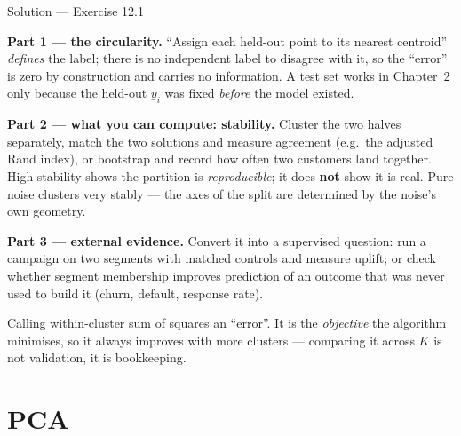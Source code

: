 \documentclass[aspectratio=169,11pt]{beamer}
\begin{document}
\begin{frame}{Solution --- Exercise 12.1}
  \footnotesize
\begin{solutionbox}
  \textbf{Part 1 --- the circularity.} ``Assign each held-out point to its nearest
  centroid'' \emph{defines} the label; there is no independent label to disagree with it,
  so the ``error'' is zero by construction and carries no information. A test set works in
  Chapter~2 only because the held-out $y_i$ was fixed \emph{before} the model existed.

  \medskip
  \textbf{Part 2 --- what you can compute: stability.} Cluster the two halves separately,
  match the two solutions and measure agreement (e.g.\ the adjusted Rand index), or
  bootstrap and record how often two customers land together. High stability shows the
  partition is \emph{reproducible}; it does \textbf{not} show it is real. Pure noise
  clusters very stably --- the axes of the split are determined by the noise's own
  geometry.

  \medskip
  \textbf{Part 3 --- external evidence.} Convert it into a supervised question:
  run a campaign on two segments with matched controls and measure uplift; or check
  whether segment membership improves prediction of an outcome that was never used to
  build it (churn, default, response rate).
\end{solutionbox}
\begin{mistake}
  Calling within-cluster sum of squares an ``error''. It is the \emph{objective} the
  algorithm minimises, so it always improves with more clusters --- comparing it across $K$
  is not validation, it is bookkeeping.
\end{mistake}
\end{frame}

\section{PCA}
\end{document}
